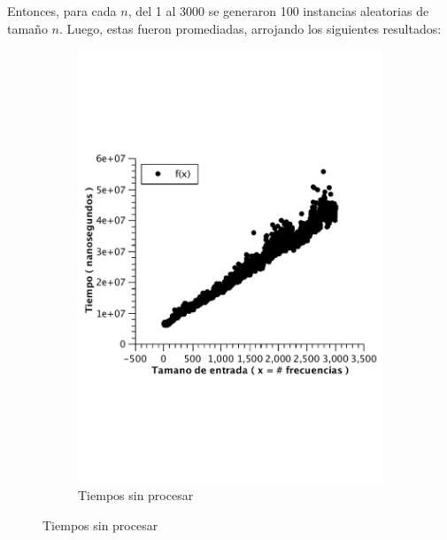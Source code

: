 Entonces, para cada $n$, del 1 al 3000 se generaron 100 instancias aleatorias de tamaño $n$.
Luego, estas fueron promediadas, arrojando los siguientes resultados:

\begin{figure}[H]
        \centering
        \begin{subfigure}[b]{0.5\textwidth}
                \includegraphics[width=\textwidth]{imagenes/af-rand-nlogn.pdf}
                \caption*{Tiempos sin procesar}
        \end{subfigure}%
\end{figure}

